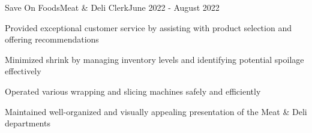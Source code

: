 \begin{resume_employer}{Save On Foods}{Meat \& Deli Clerk}{}{June 2022 - August 2022}
    \item Provided exceptional customer service by assisting with product selection and offering recommendations
    \item Minimized shrink by managing inventory levels and identifying potential spoilage effectively
    \item Operated various wrapping and slicing machines safely and efficiently
    \item Maintained well-organized and visually appealing presentation of the Meat \& Deli departments
\end{resume_employer}

